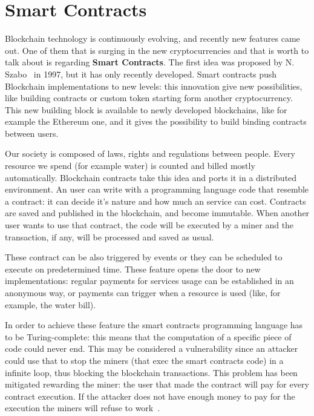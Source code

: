 \section{Smart Contracts}
\label{sec:smart_contracts}

Blockchain technology is continuously evolving, and recently new features came
out. One of them that is surging in the new cryptocurrencies and that is worth
to talk about is regarding \textbf{Smart Contracts}.
The first idea was proposed by N. Szabo~\cite{szabo97} in 1997, but it has
only recently developed. Smart contracts push Blockchain implementations to
new levels: this innovation give new possibilities, like building contracts or
custom token starting form another cryptocurrency.
This new building block is available to newly developed blockchains, like for
example the Ethereum one, and it gives the possibility to build binding
contracts between users.

Our society is composed of laws, rights and regulations between people. Every
resource we spend (for example water) is counted and billed mostly
automatically.
Blockchain contracts take this idea and ports it in a distributed environment.
An user can write with a programming language code that resemble a contract: it
can decide it's nature and how much an service can cost. Contracts are saved and
published in the blockchain, and become immutable.
When another user wants to use that contract, the code will be executed by a
miner and the transaction, if any, will be processed and saved as usual.

These contract can be also triggered by events or they can be scheduled to
execute on predetermined time. These feature opens the door to new
implementations: regular payments for services usage can be established in an
anonymous way, or payments can trigger when a resource is used (like, for
example, the water bill).

In order to achieve these feature the smart contracts programming language has
to be Turing-complete: this means that the computation of a specific piece of
code could never end. This may be considered a vulnerability since an attacker
could use that to stop the miners (that exec the smart contracts code) in a
infinite loop, thus blocking the blockchain transactions. This problem has been
mitigated rewarding the miner: the user that made the contract will pay for
every contract execution. If the attacker does not have enough money to pay for
the execution the miners will refuse to work~\cite{kosba16}.
